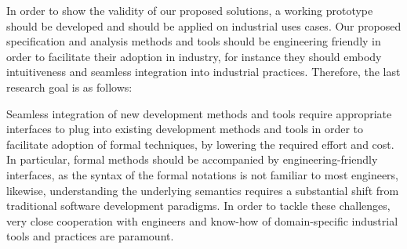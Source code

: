 In order to show the validity of our proposed solutions, a working prototype should be developed and should be applied on industrial uses cases. Our proposed specification and analysis methods and tools should be engineering friendly in order to facilitate their adoption in industry, for instance they should embody intuitiveness and seamless integration into industrial practices. Therefore, the last research goal is as follows:
\begin{researchgoal}
\end{researchgoal}

Seamless integration of new development methods and tools require appropriate interfaces to plug into existing development methods and tools in order to facilitate adoption of formal techniques, by lowering the required effort and cost. In particular, formal methods should be accompanied by engineering-friendly interfaces, as the syntax of the formal notations is not familiar to most engineers, likewise, understanding the underlying semantics requires a substantial shift from traditional software development paradigms. In order to tackle these challenges, very close cooperation with engineers and know-how of domain-specific industrial tools and practices are paramount.

